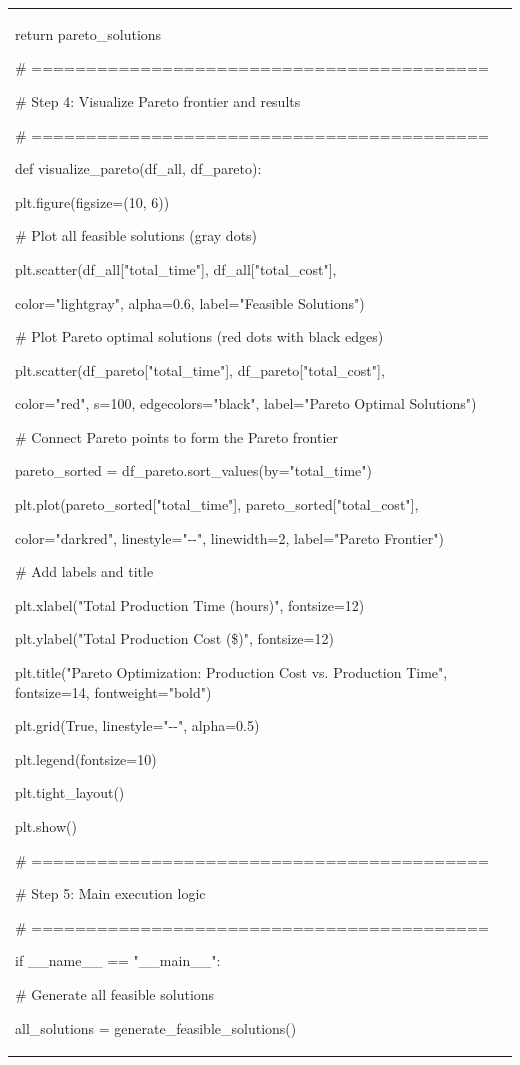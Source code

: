 \begin{longtable}[]{@{}
  >{\raggedright\arraybackslash}p{}@{}}
return pareto\_solutions

\# ==========================================

\# Step 4: Visualize Pareto frontier and results

\# ==========================================

def visualize\_pareto(df\_all, df\_pareto):

plt.figure(figsize=(10, 6))

\# Plot all feasible solutions (gray dots)

plt.scatter(df\_all{[}"total\_time"{]}, df\_all{[}"total\_cost"{]},

color="lightgray", alpha=0.6, label="Feasible Solutions")

\# Plot Pareto optimal solutions (red dots with black edges)

plt.scatter(df\_pareto{[}"total\_time"{]},
df\_pareto{[}"total\_cost"{]},

color="red", s=100, edgecolors="black", label="Pareto Optimal
Solutions")

\# Connect Pareto points to form the Pareto frontier

pareto\_sorted = df\_pareto.sort\_values(by="total\_time")

plt.plot(pareto\_sorted{[}"total\_time"{]},
pareto\_sorted{[}"total\_cost"{]},

color="darkred", linestyle="-\/-", linewidth=2, label="Pareto Frontier")

\# Add labels and title

plt.xlabel("Total Production Time (hours)", fontsize=12)

plt.ylabel("Total Production Cost (\$)", fontsize=12)

plt.title("Pareto Optimization: Production Cost vs. Production Time",
fontsize=14, fontweight="bold")

plt.grid(True, linestyle="-\/-", alpha=0.5)

plt.legend(fontsize=10)

plt.tight\_layout()

plt.show()

\# ==========================================

\# Step 5: Main execution logic

\# ==========================================

if \_\_name\_\_ == "\_\_main\_\_":

\# Generate all feasible solutions

all\_solutions = generate\_feasible\_solutions()


\end{longtable}
